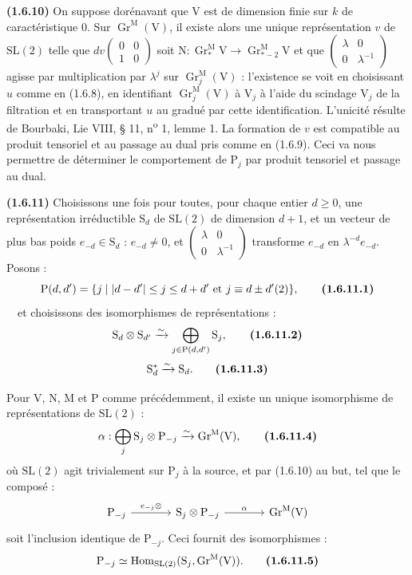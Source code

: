 \documentclass[11pt,leqno]{article}
\newcommand{\Page}[1]{\ifvmode\noindent\else\unskip\ \fi{\footnotesize\textcolor{gray}{[p.\,#1]}}\ \ignorespaces}
\begin{document}
\textbf{(1.6.10)} On suppose dorénavant que \(\mathrm{V}\) est de dimension finie sur \(k\) de caractéristique \(0\). Sur \(\operatorname{Gr}^{\mathrm{M}}(\mathrm{V})\), il existe alors une unique représentation \(v\) de \(\mathrm{SL}(2)\) telle que \(dv\begin{pmatrix}0&0\\1&0\end{pmatrix}\) soit \(\mathrm{N}:\operatorname{Gr}_*^{\mathrm{M}}\mathrm{V}\to\operatorname{Gr}_{*-2}^{\mathrm{M}}\mathrm{V}\) et que \(\begin{pmatrix}\lambda&0\\0&\lambda^{-1}\end{pmatrix}\) agisse par multiplication par \(\lambda^j\) sur \(\operatorname{Gr}_j^{\mathrm{M}}(\mathrm{V})\) : l’existence se voit en choisissant \(u\) comme en (1.6.8), en identifiant \(\operatorname{Gr}_j^{\mathrm{M}}(\mathrm{V})\) à \(\mathrm{V}_j\) à l’aide du scindage \(\mathrm{V}_j\) de la filtration et en transportant \(u\) au gradué par cette identification. L’unicité résulte de Bourbaki, Lie VIII, § 11, n\textsuperscript{o} 1, lemme 1. La formation de \(v\) est compatible au produit tensoriel et au passage au dual pris comme en (1.6.9). Ceci va nous permettre de déterminer le comportement de \(\mathrm{P}_j\) par produit tensoriel et passage au dual.

\textbf{(1.6.11)} Choisissons une fois pour toutes, pour chaque entier \(d\ge0\), une représentation irréductible \(\mathrm{S}_d\) de \(\mathrm{SL}(2)\) de dimension \(d+1\), et un vecteur de plus bas poids \(e_{-d}\in\mathrm{S}_d\) : \(e_{-d}\ne0\), et \(\begin{pmatrix}\lambda&0\\0&\lambda^{-1}\end{pmatrix}\) transforme \(e_{-d}\) en \(\lambda^{-d}e_{-d}\). Posons :
\[
\mathrm{P}(d,d')=\{j\mid |d-d'|\le j\le d+d'\text{ et }j\equiv d\pm d'(2)\},
\tag*{\textbf{(1.6.11.1)}}
\]
\Page{168}et choisissons des isomorphismes de représentations :
\[
\mathrm{S}_d\otimes\mathrm{S}_{d'}
\xrightarrow{\sim}
\bigoplus_{j\in\mathrm{P}(d,d')}\mathrm{S}_j,
\tag*{\textbf{(1.6.11.2)}}
\]
\[
\mathrm{S}_d^*\xrightarrow{\sim}\mathrm{S}_d.
\tag*{\textbf{(1.6.11.3)}}
\]

Pour \(\mathrm{V}\), \(\mathrm{N}\), \(\mathrm{M}\) et \(\mathrm{P}\) comme précédemment, il existe un unique isomorphisme de représentations de \(\mathrm{SL}(2)\) :
\[
\alpha:\bigoplus_j\mathrm{S}_j\otimes\mathrm{P}_{-j}
\xrightarrow{\sim}\operatorname{Gr}^{\mathrm{M}}(\mathrm{V}),
\tag*{\textbf{(1.6.11.4)}}
\]
où \(\mathrm{SL}(2)\) agit trivialement sur \(\mathrm{P}_j\) à la source, et par (1.6.10) au but, tel que le composé :
\[
\begin{tikzcd}[ampersand replacement=\&,column sep=large]
\mathrm{P}_{-j}
  \arrow[r,"{e_{-j}\otimes}"]
  \& \mathrm{S}_j\otimes\mathrm{P}_{-j}
  \arrow[r,"\alpha"]
  \& \operatorname{Gr}^{\mathrm{M}}(\mathrm{V})
\end{tikzcd}
\]
soit l’inclusion identique de \(\mathrm{P}_{-j}\). Ceci fournit des isomorphismes :
\[
\mathrm{P}_{-j}\simeq
\operatorname{Hom}_{\mathrm{SL}(2)}
(\mathrm{S}_j,\operatorname{Gr}^{\mathrm{M}}(\mathrm{V})).
\tag*{\textbf{(1.6.11.5)}}
\]
\end{document}
